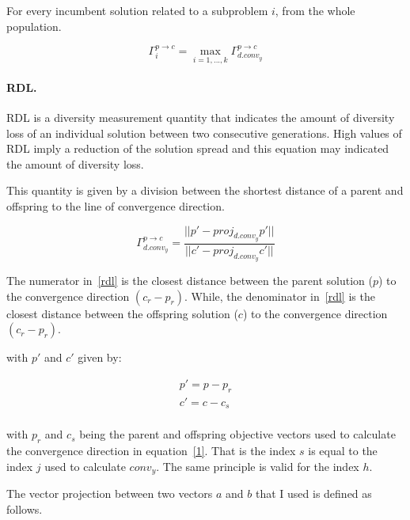 \documentclass{IEEEtran}
\begin{document}
For every incumbent solution related to a subproblem $i$, from the whole population.

\begin{equation}
\Gamma_{i}^{p \rightarrow c} = \underset{i=1,...,k}{\max} \Gamma_{d.conv_{y}}^{p \rightarrow c}
\end{equation}


\paragraph{RDL.} RDL is a diversity measurement quantity that indicates the amount of diversity loss of an individual solution between two consecutive generations. High values of RDL imply a reduction of the solution spread and this equation may indicated the amount of diversity loss.

This quantity is given by a division between the shortest distance of a parent and offspring to the line of convergence direction.

\begin{equation}
\label{rdl}
\Gamma_{d.conv_{y}}^{p \rightarrow c} = \dfrac{ ||p \prime - proj_{d.conv_{y}}p \prime|| }{||c \prime - proj_{d.conv_{y}}c \prime||}
\end{equation}

The numerator in~\ref{rdl} is the closest distance between the parent solution ($p$) to the convergence direction $(c_r - p_r)$. While, the denominator in~\ref{rdl} is the closest distance between the offspring solution ($c$) to the convergence direction $(c_r - p_r)$. %

with $p\prime$ and $c\prime $ given by:

\begin{equation}
\begin{split}
p\prime = p - p_r\\
c\prime = c - c_s\\
\end{split}
\end{equation}

with $p_r$ and $c_s$ being the parent and offspring objective vectors used to calculate the convergence direction in equation~\ref{1}. That is the index $s$ is equal to the index $j$ used to calculate $conv_{y}$. The same principle is valid for the index $h$.
 
The vector projection between two vectors $a$ and $b$ that I used is defined as follows.
\end{document}
